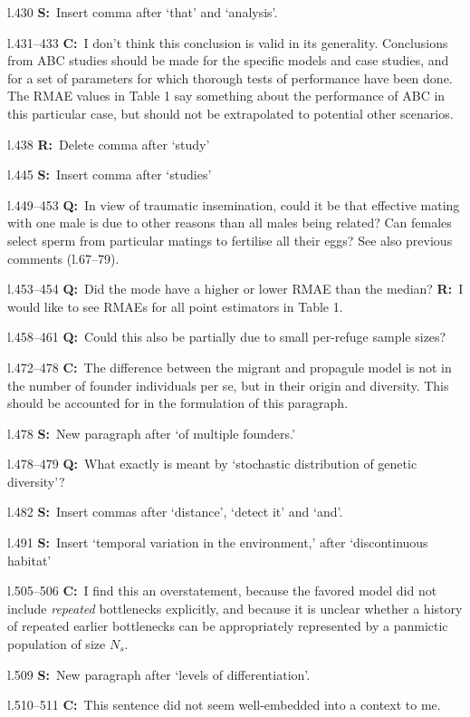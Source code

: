 \documentclass[11pt]{article}
\newenvironment{my_description}
{\begin{description}
  \setlength{\itemsep}{2pt}
  \setlength{\parskip}{0pt}
  \setlength{\parsep}{0pt}}
{\end{description}}
\newcommand{\C}{\textbf{C:}\ }
\newcommand{\Q}{\textbf{Q:}\ }
\newcommand{\R}{\textbf{R:}\ }
\newcommand{\V}{\textbf{S:}\ }
\begin{document}
\begin{my_description}
	\item[l.430] \V Insert comma after `that' and `analysis'.
	\item[l.431--433] \C I don't think this conclusion is valid in its generality. Conclusions from ABC studies should be made for the specific models and case studies, and for a set of parameters for which thorough tests of performance have been done. The RMAE values in Table 1 say something about the performance of ABC in this particular case, but should not be extrapolated to potential other scenarios.
	\item[l.438] \R Delete comma after `study'
	\item[l.445] \V Insert comma after `studies'
	\item[l.449--453] \Q In view of traumatic insemination, could it be that effective mating with one male is due to other reasons than all males being related? Can females select sperm from particular matings to fertilise all their eggs? See also previous comments (l.67--79).
	\item[l.453--454] \Q Did the mode have a higher or lower RMAE than the median? \R I would like to see RMAEs for all point estimators in Table 1.
	\item[l.458--461] \Q Could this also be partially due to small per-refuge sample sizes?
	\item[l.472--478] \C The difference between the migrant and propagule model is not in the number of founder individuals per se, but in their origin and diversity. This should be accounted for in the formulation of this paragraph.
	\item[l.478] \V New paragraph after `of multiple founders.'	
	\item[l.478--479] \Q What exactly is meant by `stochastic distribution of genetic diversity'?
	\item[l.482] \V Insert commas after `distance', `detect it' and `and'.
	\item[l.491] \V Insert `temporal variation in the environment,' after `discontinuous habitat'
	\item[l.505--506] \C I find this an overstatement, because the favored model did not include \emph{repeated} bottlenecks explicitly, and because it is unclear whether a history of repeated earlier bottlenecks can be appropriately represented by a panmictic population of size $N_s$.
	\item[l.509] \V New paragraph after `levels of differentiation'.
	\item[l.510--511] \C This sentence did not seem well-embedded into a context to me.

\end{my_description}
\end{document}
